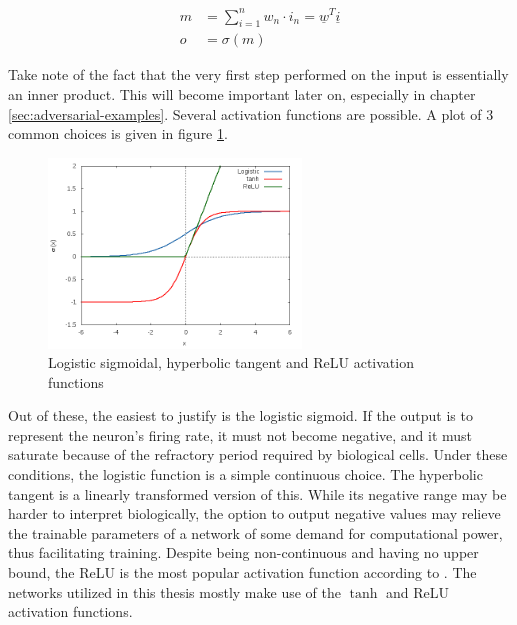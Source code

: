 \documentclass[11pt, a4paper]{article}
\newcommand\braces[1]{\left(#1\right)}
\renewcommand{\vec}[1]{\underline{#1}}
\begin{document}
\begin{align}
	m &= \sum_{i=1}^n w_n \cdot i_n = \vec{w}^T \vec{i} \label{eq:neuron-math-membrane-potential} \\
	o &= \sigma \braces{m} \label{eq:neuron-math-activation-function}
\end{align}



Take note of the fact that the very first step performed on the input is essentially an inner product. This will become important later on, especially in chapter \ref{sec:adversarial-examples}. Several activation functions are possible. A plot of 3 common choices is given in figure \ref{fig:activation-functions}.

\begin{figure}[htb]
	\centering
	\includegraphics[width=0.6\textwidth]{images/activation_functions.png}
	\caption{Logistic sigmoidal, hyperbolic tangent and ReLU activation functions}
	\label{fig:activation-functions}
\end{figure}

Out of these, the easiest to justify is the logistic sigmoid. If the output is to represent the neuron's firing rate, it must not become negative, and it must saturate because of the refractory period required by biological cells. Under these conditions, the logistic function is a simple continuous choice. The hyperbolic tangent is a linearly transformed version of this. While its negative range may be harder to interpret biologically, the option to output negative values may relieve the trainable parameters of a network of some demand for computational power, thus facilitating training. Despite being non-continuous and having no upper bound, the ReLU is the most popular activation function according to \cite{deep-learning}. The networks utilized in this thesis mostly make use of the $\tanh$ and ReLU activation functions.
\end{document}
